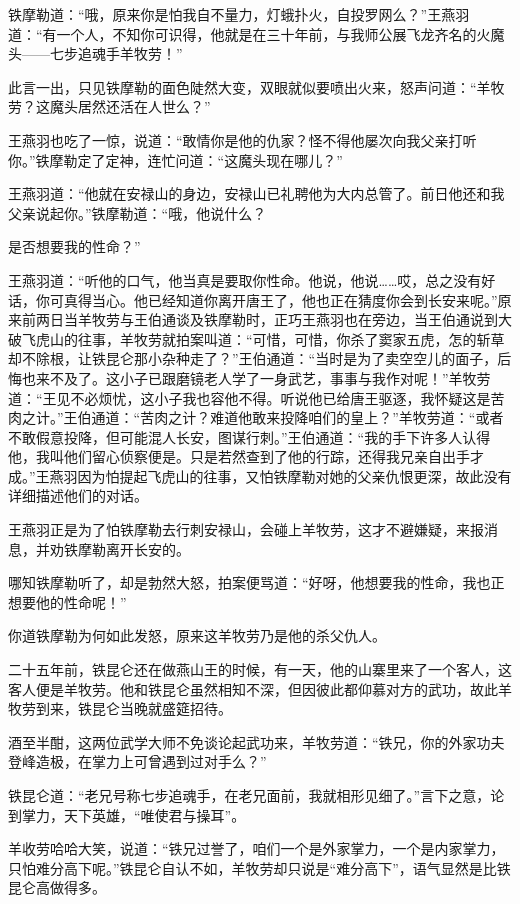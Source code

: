 \documentclass[12pt,oneside]{book}
\begin{document}
铁摩勒道：``哦，原来你是怕我自不量力，灯蛾扑火，自投罗网么？''王燕羽道：``有一个人，不知你可识得，他就是在三十年前，与我师公展飞龙齐名的火魔头------七步追魂手羊牧劳！''

此言一出，只见铁摩勒的面色陡然大变，双眼就似要喷出火来，怒声问道：``羊牧劳？这魔头居然还活在人世么？''

王燕羽也吃了一惊，说道：``敢情你是他的仇家？怪不得他屡次向我父亲打听你。''铁摩勒定了定神，连忙问道：``这魔头现在哪儿？''

王燕羽道：``他就在安禄山的身边，安禄山已礼聘他为大内总管了。前日他还和我父亲说起你。''铁摩勒道：``哦，他说什么？

是否想要我的性命？''

王燕羽道：``听他的口气，他当真是要取你性命。他说，他说\ldots\ldots 哎，总之没有好话，你可真得当心。他已经知道你离开唐王了，他也正在猜度你会到长安来呢。''原来前两日当羊牧劳与王伯通谈及铁摩勒时，正巧王燕羽也在旁边，当王伯通说到大破飞虎山的往事，羊牧劳就拍案叫道：``可惜，可惜，你杀了窦家五虎，怎的斩草却不除根，让铁昆仑那小杂种走了？''王伯通道：``当时是为了卖空空儿的面子，后悔也来不及了。这小子已跟磨镜老人学了一身武艺，事事与我作对呢！''羊牧劳道：``王见不必烦忧，这小子我也容他不得。听说他已给唐王驱逐，我怀疑这是苦肉之计。''王伯通道：``苦肉之计？难道他敢来投降咱们的皇上？''羊牧劳道：``或者不敢假意投降，但可能混人长安，图谋行刺。''王伯通道：``我的手下许多人认得他，我叫他们留心侦察便是。只是若然查到了他的行踪，还得我兄亲自出手才成。''王燕羽因为怕提起飞虎山的往事，又怕铁摩勒对她的父亲仇恨更深，故此没有详细描述他们的对话。

王燕羽正是为了怕铁摩勒去行刺安禄山，会碰上羊牧劳，这才不避嫌疑，来报消息，并劝铁摩勒离开长安的。

哪知铁摩勒听了，却是勃然大怒，拍案便骂道：``好呀，他想要我的性命，我也正想要他的性命呢！''

你道铁摩勒为何如此发怒，原来这羊牧劳乃是他的杀父仇人。

二十五年前，铁昆仑还在做燕山王的时候，有一天，他的山寨里来了一个客人，这客人便是羊牧劳。他和铁昆仑虽然相知不深，但因彼此都仰慕对方的武功，故此羊牧劳到来，铁昆仑当晚就盛筵招待。

酒至半酣，这两位武学大师不免谈论起武功来，羊牧劳道：``铁兄，你的外家功夫登峰造极，在掌力上可曾遇到过对手么？''

铁昆仑道：``老兄号称七步追魂手，在老兄面前，我就相形见细了。''言下之意，论到掌力，天下英雄，``唯使君与操耳''。

羊收劳哈哈大笑，说道：``铁兄过誉了，咱们一个是外家掌力，一个是内家掌力，只怕难分高下呢。''铁昆仑自认不如，羊牧劳却只说是``难分高下''，语气显然是比铁昆仑高做得多。
\end{document}

